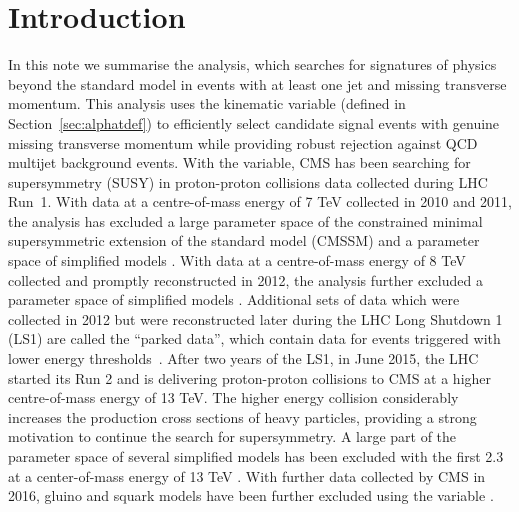 \section{Introduction}
\label{sec:intro}


In this note we summarise the \alphat analysis, which searches for
signatures of physics beyond the standard model in events with at
least one jet and missing transverse momentum. This analysis uses the
kinematic variable \alphat (defined in Section~\ref{sec:alphatdef}) to
efficiently select candidate signal events with genuine missing
transverse momentum while providing robust rejection against QCD
multijet background events. With the \alphat variable, CMS has been
searching for supersymmetry (SUSY) in proton-proton collisions data
collected during LHC Run~1. With data at a centre-of-mass energy of 7
TeV collected in 2010 and 2011, the \alphat analysis has excluded a
large parameter space of the constrained minimal supersymmetric
extension of the standard model (CMSSM) \cite{Khachatryan:2011tk,
  Chatrchyan:2011zy, Chatrchyan:2012wa} and a parameter space of
simplified models \cite{Chatrchyan:2012wa}. With data at a
centre-of-mass energy of 8 TeV collected and promptly reconstructed in
2012, the \alphat analysis further excluded a parameter space of
simplified models \cite{Chatrchyan:2013lya}. Additional sets of data
which were collected in 2012 but were reconstructed later during the
LHC Long Shutdown 1 (LS1) are called the ``parked data'', which
contain data for events triggered with lower energy
thresholds~\cite{Khachatryan:2016pxa}.  After two years of the LS1, in
June 2015, the LHC started its Run 2 and is delivering proton-proton
collisions to CMS at a higher centre-of-mass energy of 13 TeV. The
higher energy collision considerably increases the production cross
sections of heavy particles, providing a strong motivation to continue
the search for supersymmetry.  A large part of the parameter space of
several simplified models has been excluded with the first 2.3 \ifb at
a center-of-mass energy of 13 TeV \cite{Khachatryan:2016dvc}.  With
further data collected by CMS in 2016, gluino and squark models have
been further excluded using the \alphat variable
\cite{CMS-PAS-SUS-16-016}.

